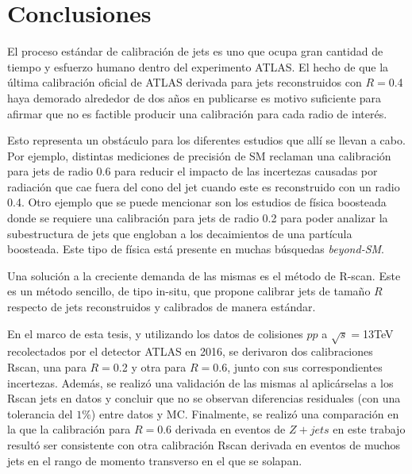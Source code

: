 \chapter{Conclusiones}\label{Conclus}

El proceso estándar de calibración de jets es uno que ocupa gran cantidad de tiempo y esfuerzo humano dentro del experimento ATLAS. El hecho de que la última calibración oficial\cite{JESpaper} de ATLAS derivada para jets reconstruidos con $R=$0.4 haya demorado alrededor de dos años en publicarse es motivo suficiente para afirmar que no es factible producir una calibración para cada radio de interés. 

Esto representa un obstáculo para los diferentes estudios que allí se llevan a cabo. Por ejemplo, distintas mediciones de precisión de SM reclaman una calibración para jets de radio 0.6 para reducir el impacto de las incertezas causadas por radiación que cae fuera del cono del jet cuando este es reconstruido con un radio 0.4. Otro ejemplo que se puede mencionar son los estudios de física boosteada donde se requiere una calibración para jets de radio 0.2 para poder analizar la subestructura de jets que engloban a los decaimientos de una partícula boosteada. Este tipo de física está presente en muchas búsquedas \textit{beyond-SM}.  

Una solución a la creciente demanda de las mismas es el método de R-scan. Este es un método sencillo, de tipo in-situ, que propone calibrar jets de tamaño $R$ respecto de jets reconstruidos y calibrados de manera estándar. 

En el marco de esta tesis, y utilizando los datos de colisiones $pp$ a $\sqrt{s}=$13TeV recolectados por el detector ATLAS en 2016, se derivaron dos calibraciones Rscan, una para $R=$0.2 y otra para $R=$0.6, junto con sus correspondientes incertezas. Además, se realizó una validación de las mismas al aplicárselas a los Rscan jets en datos y concluir que no se observan diferencias residuales (con una tolerancia del $1\%$) entre datos y MC. Finalmente, se realizó una comparación en la que la calibración para $R=$0.6 derivada en eventos de $Z+jets$ en este trabajo resultó ser consistente con otra calibración Rscan derivada en eventos de muchos jets en el rango de momento transverso en el que se solapan.     




